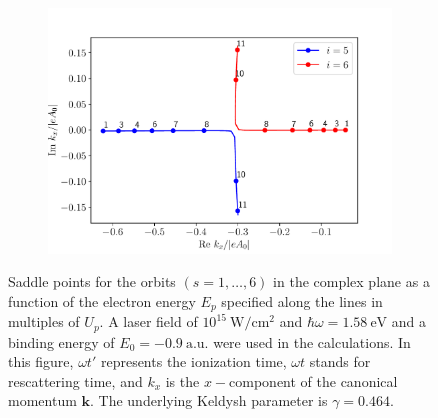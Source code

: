 \begin{figure}
\begin{subfigure}[b]{0.33\linewidth}
\end{subfigure}
\begin{subfigure}[b]{0.33\linewidth}
  \includegraphics[width=\textwidth]{figures/ch_ATI_SPA/rescattering/momentum56.pdf}
\end{subfigure}
\caption{Saddle points for the orbits $(s = 1,\dots,6)$ in the complex
  plane as a function of the electron energy $E_{p}$ specified along
  the lines in multiples of $U_{p}$. A laser field of
  $10^{15}\ \mathrm{W/cm^{2}}$ and $\hbar\omega = 1.58\ \mathrm{eV}$
  and a binding energy of $E_{0} = -0.9\ \mathrm{a.u.}$ were used in
  the calculations. In this figure, $\omega t'$ represents the
  ionization time, $\omega t$ stands for rescattering time, and
  $k_{x}$ is the $x-$component of the canonical momentum
  $\mathbf{k}$. The underlying Keldysh parameter is $\gamma = 0.464$.}
  \label{fig:complex_paths}
\end{figure}

